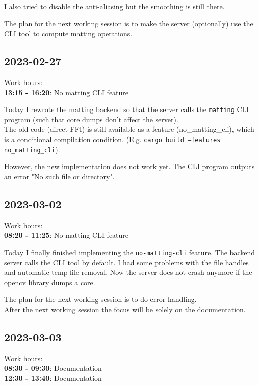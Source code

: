 \documentclass{article}
\begin{document}
I also tried to disable the anti-aliasing but the smoothing is still there.

The plan for the next working session is to make the server
(optionally) use the CLI tool to compute matting operations.

\subsection{2023-02-27}

Work hours:\\
\textbf{13:15 - 16:20}: No matting CLI feature

Today I rewrote the matting backend so that the server calls the
\texttt{matting} CLI program (such that core dumps don't affect
the server). \\
The old code (direct FFI) is still available as a feature (no\_matting\_cli),
which is a conditional compilation condition. (E.g. \texttt{cargo build --features no\_matting\_cli}).

However, the new implementation does not work yet. The CLI program
outputs an error "No such file or directory".

\pagebreak

\subsection{2023-03-02}

Work hours:\\
\textbf{08:20 - 11:25}: No matting CLI feature

Today I finally finished implementing the \texttt{no-matting-cli} feature.
The backend server calls the CLI tool by default. I had some problems with the
file handles and automatic temp file removal.
Now the server does not crash anymore if the opencv library dumps a core.

The plan for the next working session is to do error-handling. \\
After the next working session the focus will be solely on the documentation.

\subsection{2023-03-03}

Work hours:\\
\textbf{08:30 - 09:30}: Documentation \\
\textbf{12:30 - 13:40}: Documentation
\end{document}

